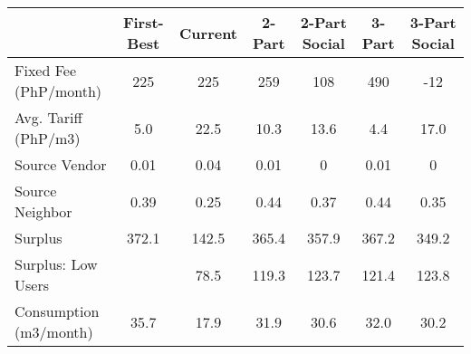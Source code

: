 \begin{tabular}{lcccccc}
  & First-Best & Current & 2-Part  & 2-Part Social  & 3-Part & 3-Part Social \\
\hline
Fixed Fee (PhP/month) &225&225&259&108&490&-12\\
Avg. Tariff (PhP/m3) &5.0&22.5&10.3&13.6&4.4&17.0\\
Source Vendor & 0.01 &0.04 &0.01 &0 &0.01 &0\\
Source Neighbor &0.39 &0.25 &0.44 &0.37 &0.44 &0.35 \\
Surplus &372.1&142.5&365.4&357.9&367.2&349.2\\
Surplus: Low Users & &78.5&119.3&123.7&121.4&123.8\\
Consumption (m3/month) &35.7&17.9&31.9&30.6&32.0&30.2\\
\hline
\end{tabular}
